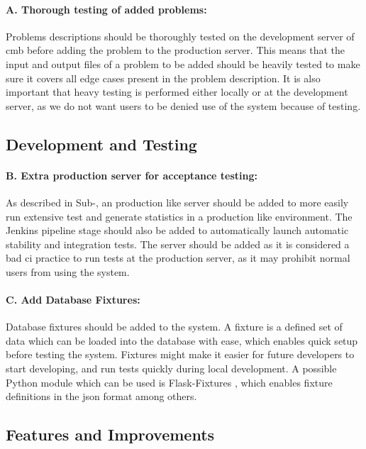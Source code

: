\paragraph*{A. Thorough testing of added problems:} Problems descriptions should be thoroughly tested on the development server of \gls{cmb} before adding the problem to the production server. This means that the input and output files of a problem to be added should be heavily tested to make sure it covers all edge cases present in the problem description. It is also important that heavy testing is performed either locally or at the development server, as we do not want users to be denied use of the system because of testing.

\subsection*{Development and Testing}
\paragraph*{B. Extra production server for acceptance testing:} As described in Sub-, an production like server should be added to more easily run extensive test and generate statistics in a production like environment. The Jenkins pipeline stage should also be added to automatically launch automatic stability and integration tests. The server should be added as it is considered a bad \gls{ci} practice to run tests at the production server, as it may prohibit normal users from using the system.

\paragraph*{C. Add Database Fixtures:} Database fixtures should be added to the system. A fixture is a defined set of data which can be loaded into the database with ease, which enables quick setup before testing the system. Fixtures might make it easier for future developers to start developing, and run tests quickly during local development. A possible Python module which can be used is Flask-Fixtures \cite{FLASK-FIXTURES}, which enables fixture definitions in the \gls{json} format among others.

\subsection*{Features and Improvements}
